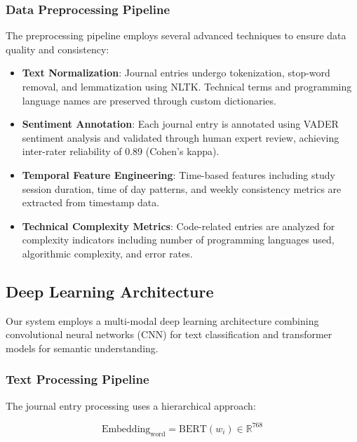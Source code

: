 \documentclass[conference,10pt]{IEEEtran}
\begin{document}
\subsubsection{Data Preprocessing Pipeline}

The preprocessing pipeline employs several advanced techniques to ensure data quality and consistency:

\begin{itemize}
\item \textbf{Text Normalization}: Journal entries undergo tokenization, stop-word removal, and lemmatization using NLTK. Technical terms and programming language names are preserved through custom dictionaries.

\item \textbf{Sentiment Annotation}: Each journal entry is annotated using VADER sentiment analysis and validated through human expert review, achieving inter-rater reliability of 0.89 (Cohen's kappa).

\item \textbf{Temporal Feature Engineering}: Time-based features including study session duration, time of day patterns, and weekly consistency metrics are extracted from timestamp data.

\item \textbf{Technical Complexity Metrics}: Code-related entries are analyzed for complexity indicators including number of programming languages used, algorithmic complexity, and error rates.
\end{itemize}

\subsection{Deep Learning Architecture}

Our system employs a multi-modal deep learning architecture combining convolutional neural networks (CNN) for text classification and transformer models for semantic understanding.

\subsubsection{Text Processing Pipeline}

The journal entry processing uses a hierarchical approach:

\begin{equation}
\text{Embedding}_{\text{word}} = \text{BERT}(w_i) \in \mathbb{R}^{768}
\end{equation}
\end{document}
